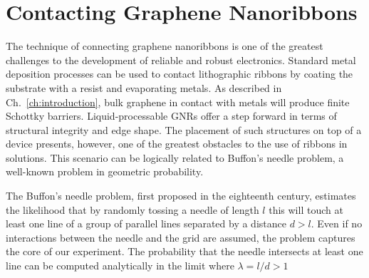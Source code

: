 \section{Contacting Graphene Nanoribbons}

The technique of connecting graphene nanoribbons is one of the greatest challenges to the development of reliable and robust electronics. Standard metal deposition processes can be used to contact lithographic ribbons by coating the substrate with a resist and evaporating metals. As described in Ch.~\ref{ch:introduction}, bulk graphene in contact with metals will produce finite Schottky barriers. Liquid-processable \glspl{GNR} offer a step forward in terms of structural integrity and edge shape. The placement of such structures on top of a device presents, however, one of the greatest obstacles to the use of ribbons in solutions. This scenario can be logically related to Buffon's needle problem, a well-known problem in geometric probability.

The Buffon's needle problem, first proposed in the eighteenth century, estimates the likelihood that by randomly tossing a needle of length $l$ this will touch at least one line of a group of parallel lines separated by a distance $d > l$. Even if no interactions between the needle and the grid are assumed, the problem captures the core of our experiment. The probability that the needle intersects at least one line can be computed analytically in the limit where $\lambda = l/d > 1$~\cite{uspensky1937introduction}

